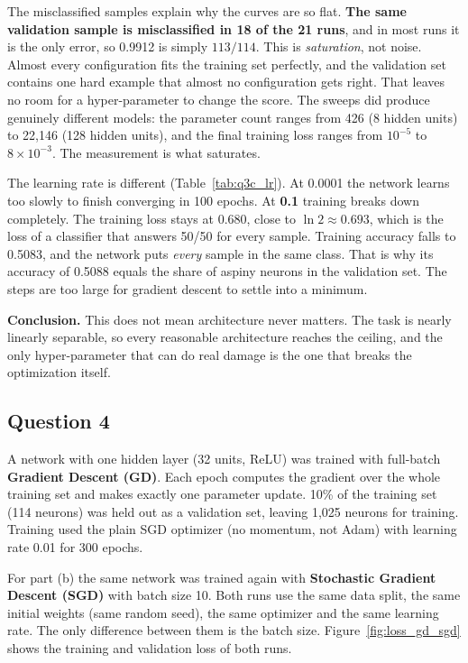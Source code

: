 \documentclass[11pt]{article}
\begin{document}
The misclassified samples explain why the curves are so flat. \textbf{The same validation sample is misclassified in 18 of the 21 runs}, and in most runs it is the only error, so 0.9912 is simply $113/114$. This is \emph{saturation}, not noise. Almost every configuration fits the training set perfectly, and the validation set contains one hard example that almost no configuration gets right. That leaves no room for a hyper-parameter to change the score. The sweeps did produce genuinely different models: the parameter count ranges from 426 (8 hidden units) to 22{,}146 (128 hidden units), and the final training loss ranges from $10^{-5}$ to $8 \times 10^{-3}$. The measurement is what saturates.

The learning rate is different (Table~\ref{tab:q3c_lr}). At 0.0001 the network learns too slowly to finish converging in 100 epochs. At \textbf{0.1} training breaks down completely. The training loss stays at 0.680, close to $\ln 2 \approx 0.693$, which is the loss of a classifier that answers 50/50 for every sample. Training accuracy falls to 0.5083, and the network puts \emph{every} sample in the same class. That is why its accuracy of 0.5088 equals the share of aspiny neurons in the validation set. The steps are too large for gradient descent to settle into a minimum.

\textbf{Conclusion.} This does not mean architecture never matters. The task is nearly linearly separable, so every reasonable architecture reaches the ceiling, and the only hyper-parameter that can do real damage is the one that breaks the optimization itself.

\FloatBarrier
\subsection{Question 4}

A network with one hidden layer (32 units, ReLU) was trained with full-batch \textbf{Gradient Descent (GD)}. Each epoch computes the gradient over the whole training set and makes exactly one parameter update. 10\% of the training set (114 neurons) was held out as a validation set, leaving 1{,}025 neurons for training. Training used the plain SGD optimizer (no momentum, not Adam) with learning rate 0.01 for 300 epochs.

For part (b) the same network was trained again with \textbf{Stochastic Gradient Descent (SGD)} with batch size 10. Both runs use the same data split, the same initial weights (same random seed), the same optimizer and the same learning rate. The only difference between them is the batch size. Figure~\ref{fig:loss_gd_sgd} shows the training and validation loss of both runs.
\end{document}
